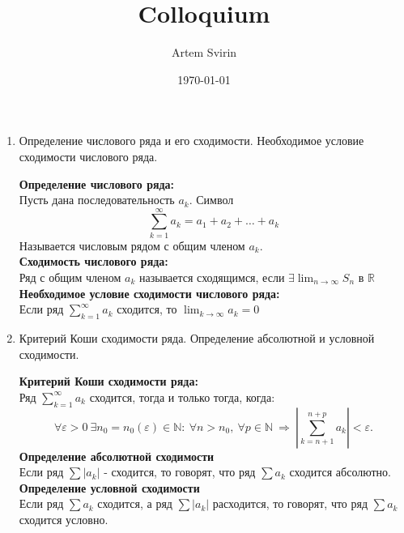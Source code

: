 \documentclass[a4paper, 12pt]{article}
\title{Colloquium}
\author{Artem Svirin}
\date{\today}
\begin{document}
\begin{titlepage}
	\maketitle
	\thispagestyle{empty}
\end{titlepage}
\clearpage
\begin{enumerate}
	\item Определение числового ряда и его сходимости. Необходимое условие сходимости числового ряда. \\
	      \begin{mdframed}
		      \textbf{Определение числового ряда:} \\
		      Пусть дана последовательность $a_k$. Символ \\
		      \[
			      \sum_{k=1}^{\infty} a_k = a_1 + a_2 + \ldots + a_k
		      \]
		      Называется числовым рядом с общим членом $a_k$. \\
		      \textbf{Сходимость числового ряда:} \\
		      Ряд с общим членом $a_k$ называется сходящимся, если $\exists \lim_{n \to \infty}S_n$ в $\mathbb{R}$ \\
		      \textbf{Необходимое условие сходимости числового ряда:} \\
		      Если ряд $\sum_{k=1}^{\infty} a_k$ сходится, то $\lim_{k \to \infty} a_k = 0$
	      \end{mdframed}
	\item Критерий Коши сходимости ряда. Определение абсолютной и условной сходимости. \\
	      \begin{mdframed}
		      \textbf{Критерий Коши сходимости ряда:} \\
		      Ряд $\sum_{k=1}^{\infty} a_k$ сходится, тогда и только тогда, когда: \\
		      \[
			      \forall \varepsilon > 0 \ \exists n_0 = n_0(\varepsilon) \in \mathbb N: \ \forall n > n_0, \ \forall p \in \mathbb{N} \ \Rightarrow \ \left| \sum\limits_{k = n+1}^{n+p} a_k \right| < \varepsilon.
		      \]
		      \textbf{Определение абсолютной сходимости} \\
		      Если ряд $\sum |a_k|$ - сходится, то говорят, что ряд $\sum a_k$ сходится абсолютно. \\
		      \textbf{Определение условной сходимости} \\
		      Если ряд $\sum a_k$ сходится, а ряд $\sum |a_k|$ расходится, то говорят, что ряд $\sum a_k$ сходится условно.
	      \end{mdframed}

\end{enumerate}
\end{document}
